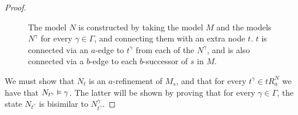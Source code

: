 \begin{proof}
\begin{figure}
\begin{center} %
\caption{
The model $N$ is constructed by taking the model $M$ and the models $N^\gamma$
for every $\gamma \in \Gamma$, and connecting them with an extra node $t$. $t$
is connected via an $a$-edge to $t^\gamma$ from each of the $N^\gamma$, and is
also connected via a $b$-edge to each $b$-successor of $s$ in $M$.
}
\end{center}
\end{figure}

We must show that $N_t$ is an $a$-refinement of $M_s$, and that for every
$t^\gamma \in tR^N_a$ we have that $N_{t^\gamma} \vDash \gamma$. The latter
will be shown by proving that for every $\gamma \in \Gamma$, the state
$N_{t^\gamma}$ is bisimilar to $N^\gamma_{t^\gamma}$.


\end{proof}
